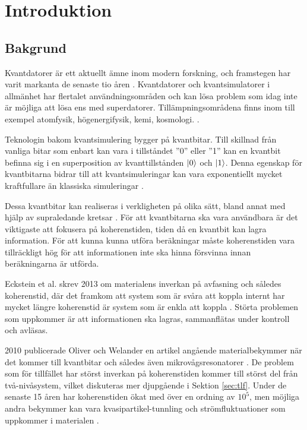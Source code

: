 \documentclass[main.tex]{subfiles}
\begin{document}
\chapter{Introduktion}
\section{Bakgrund}
Kvantdatorer är ett aktuellt ämne inom modern forskning, och framstegen har varit markanta de senaste tio åren \autocite{Bylander2017}. Kvantdatorer och kvantsimulatorer i allmänhet har flertalet användningsområden och kan lösa problem som idag inte är möjliga att lösa ens med superdatorer. Tillämpningsområdena finns inom till exempel atomfysik, högenergifysik, kemi, kosmologi. \cite{applications}.


Teknologin bakom kvantsimulering bygger på kvantbitar. Till skillnad från vanliga bitar som enbart kan vara i tillståndet ''0'' eller ''1'' kan en kvantbit befinna sig i en superposition av kvanttillstånden $\ket{0}$ och $\ket{1}$. Denna egenskap för kvantbitarna bidrar till att kvantsimuleringar kan vara exponentiellt mycket kraftfullare än klassiska simuleringar \cite{Eckstein2013}.

Dessa kvantbitar kan realiseras i verkligheten på olika sätt, bland annat med hjälp av supraledande kretsar \cite{Oliver2013}. För att kvantbitarna ska vara användbara är det viktigaste att fokusera på koherenstiden, tiden då en kvantbit kan lagra information. För att kunna kunna utföra beräkningar måste koherenstiden vara tillräckligt hög för att informationen inte ska hinna försvinna innan beräkningarna är utförda\cite{Eckstein2013}. 
 

Eckstein et al. skrev 2013 om materialens inverkan på avfasning och således koherenstid, där det framkom att system som är svåra att koppla internt har mycket längre koherenstid är system som är enkla att koppla \cite{Eckstein2013}. Störta problemen som uppkommer är att informationen ska lagras, sammanflätas under kontroll och avläsas.

2010 publicerade Oliver och Welander en artikel angående materialbekymmer när det kommer till kvantbitar och således även mikrovågsresonatorer \cite{Oliver2013
}. De problem som för tillfället har störst inverkan på koherenstiden kommer till störst del från två-nivåsystem, vilket diskuteras mer djupgående i Sektion \ref{sec:tlf}.  Under de senaste 15 åren har koherenstiden ökat med över en ordning av $10^5$, men möjliga andra bekymmer kan vara kvasipartikel-tunnling och strömfluktuationer som uppkommer i materialen \cite{Oliver2013}.
\end{document}
